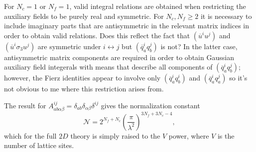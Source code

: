 \documentclass[%
    twocolumn,
superscriptaddress,
preprintnumbers,
nofootinbib,
 amsmath,amssymb,
 aps,
 prd,
 floatfix,
]{revtex4-2}
\begin{document}
For $N_c = 1$ or $N_f = 1$, valid integral relations are obtained when restricting the auxiliary fields to be purely real and symmetric. For $N_c, N_f \geq 2$ it is necessary to include imaginary parts that are antisymmetric in the relevant matrix indices in order to obtain valid relations.
Does this reflect the fact that $(\overline{u}^i u^j)$ and $(\overline{u}^i \sigma_3 u^j)$ are symmetric under $i\leftrightarrow j$ but $(\overline{q}^i_a q^j_b)$ is not?
In the latter case, antisymmetric matrix components are required in order to obtain Gaussian auxiliary field integerals with means that describe all components of $(\overline{q}^i_a q^j_b)$; however, the Fierz identities appear to involve only $(\overline{q}^i_a q^i_b)$ and $(\overline{q}^i_a q^j_a)$ so it's not obvious to me where this restriction arises from.

The result for $A_{ab\alpha\beta}^{ij} = \delta_{ab}\delta_{\alpha\beta}\delta^{ij}$ gives the normalization constant
\begin{equation}
    \mathcal{N} = 2^{N_f + N_c} \left( \frac{\pi}{\lambda^2} \right)^{3N_f + 3N_c - 4 },
\end{equation}
which for the full $2D$ theory is simply raised to the $V$ power, where $V$ is the number of lattice sites.
\end{document}
